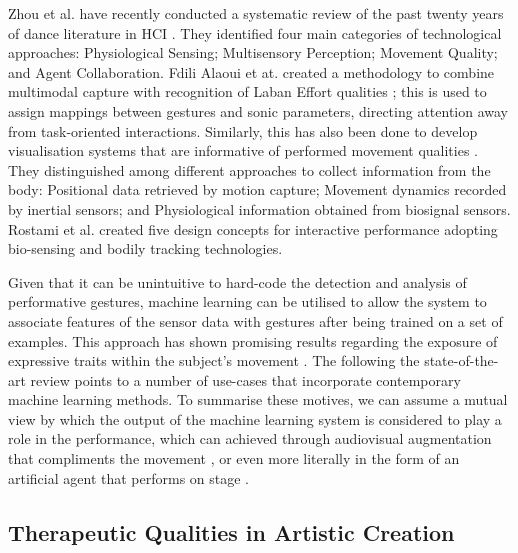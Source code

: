 Zhou et al. have recently conducted a systematic review of the past twenty years of dance literature in HCI \cite{zhou_dance_2021}. They identified four main categories of technological approaches: Physiological Sensing; Multisensory Perception; Movement Quality; and Agent Collaboration. Fdili Alaoui et at. created a methodology to combine multimodal capture with recognition of Laban Effort qualities \cite{fdili_alaoui_seeing_2017}; this is used to assign mappings between gestures and sonic parameters, directing attention away from task-oriented interactions. Similarly, this has also been done to develop visualisation systems that are informative of performed movement qualities \cite{alaoui_interactive_2015,hussain_evaluating_2019,jego_workflow_2019}. They distinguished among different approaches to collect information from the body: Positional data retrieved by motion capture; Movement dynamics recorded by inertial sensors; and Physiological information obtained from biosignal sensors. Rostami et al. \cite{rostami_bio-sensed_2017} created five design concepts for interactive performance adopting bio-sensing and bodily tracking technologies. 


Given that it can be unintuitive to hard-code the detection and analysis of performative gestures, machine learning can be utilised to allow the system to associate features of the sensor data with gestures after being trained on a set of examples. This approach has shown promising results regarding the exposure of expressive traits within the subject's movement \cite{caramiaux_understanding_2015}. The following the state-of-the-art review points to a number of use-cases that incorporate contemporary machine learning methods. To summarise these motives, we can assume a mutual view by which the output of the machine learning system is considered to play a role in the performance, which can achieved through audiovisual augmentation that compliments the movement \cite{francoise_coda_2022}, or even more literally in the form of an artificial agent that performs on stage \cite{liapis_learning_2018}.

\subsection{Therapeutic Qualities in Artistic Creation}

